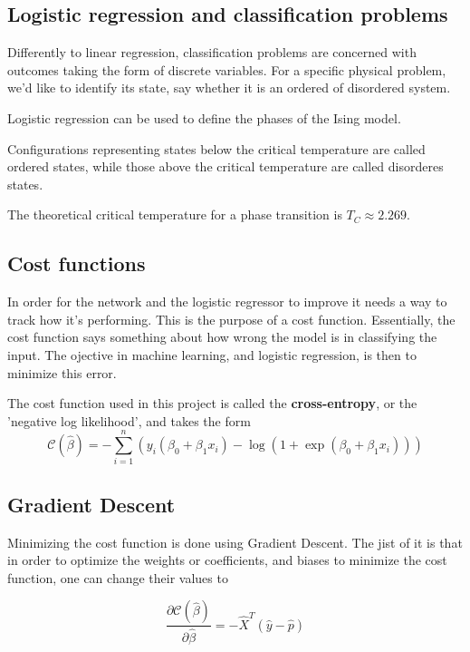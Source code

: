 \subsection{Logistic regression and classification problems}
Differently to linear regression, classification problems 
are concerned with outcomes taking the form of discrete variables. 
For a specific physical problem, we'd like to identify its state, say whether
it is an ordered of disordered system. ~\cite{LectureNotes-FysStk}

Logistic regression can be used to define the phases of the Ising
model.~\cite{LectureNotes} 

Configurations representing states below the critical temperature are called
ordered states, while those above the critical temperature are called 
disorderes states. ~\cite{Project2} 

The theoretical critical temperature for a phase transition is 
\(T_C \approx 2.269\). 

\subsection{Cost functions} 
In order for the network and the logistic regressor to improve it needs a way to 
track how it's performing. This is the purpose of a cost function. Essentially,
the cost function says something about how wrong the model is in classifying the
input. The ojective in machine learning, and logistic regression, is then to minimize
this error.

The cost function used in this project is called the \textbf{cross-entropy}, or the
'negative log likelihood', and takes the form
\begin{equation}\label{eq:cross-entropy}
	\mathcal{C}(\hat{\beta})=-\sum_{i=1}^n  \left(y_i(\beta_0+\beta_1x_i) -\log{(1+\exp{(\beta_0+\beta_1x_i)})}\right)
\end{equation}

\subsection{Gradient Descent}
Minimizing the cost function is done using Gradient Descent.
The jist of it is that in order to optimize the weights or coefficients, and biases
to minimize the cost function, one can change their values to 



\begin{equation}\label{eq:delta-c}
	\frac{\partial \mathcal{C}(\hat{\beta})}{\partial \hat{\beta}} = -\hat{X}^T\left(\hat{y}-\hat{p}\right)
\end{equation}

